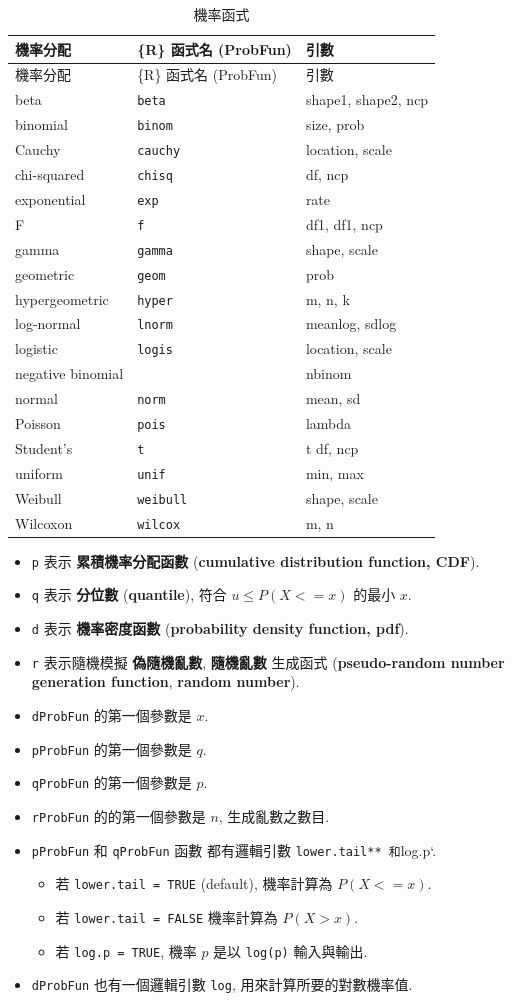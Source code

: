 \documentclass[
]{book}
\providecommand{\tightlist}{%
  \setlength{\itemsep}{0pt}\setlength{\parskip}{0pt}}
\begin{document}
\begin{longtable}[]{@{}lll@{}}
\caption{機率函式}\tabularnewline
\toprule
機率分配 & \{R\} 函式名 (ProbFun) & 引數\tabularnewline
\midrule
\endfirsthead
\toprule
機率分配 & \{R\} 函式名 (ProbFun) & 引數\tabularnewline
\midrule
\endhead
beta & \texttt{beta} & shape1, shape2, ncp\tabularnewline
binomial & \texttt{binom} & size, prob\tabularnewline
Cauchy & \texttt{cauchy} & location, scale\tabularnewline
chi-squared & \texttt{chisq} & df, ncp\tabularnewline
exponential & \texttt{exp} & rate\tabularnewline
F & \texttt{f} & df1, df1, ncp\tabularnewline
gamma & \texttt{gamma} & shape, scale\tabularnewline
geometric & \texttt{geom} & prob\tabularnewline
hypergeometric & \texttt{hyper} & m, n, k\tabularnewline
log-normal & \texttt{lnorm} & meanlog, sdlog\tabularnewline
logistic & \texttt{logis} & location, scale\tabularnewline
negative binomial & & nbinom\tabularnewline
normal & \texttt{norm} & mean, sd\tabularnewline
Poisson & \texttt{pois} & lambda\tabularnewline
Student's & \texttt{t} & t df, ncp\tabularnewline
uniform & \texttt{unif} & min, max\tabularnewline
Weibull & \texttt{weibull} & shape, scale\tabularnewline
Wilcoxon & \texttt{wilcox} & m, n\tabularnewline
\bottomrule
\end{longtable}

\begin{itemize}
\tightlist
\item
  \texttt{p} 表示 \textbf{累積機率分配函數} (\textbf{cumulative distribution function, CDF}).
\item
  \texttt{q} 表示 \textbf{分位數} (\textbf{quantile}),
  符合 \(u \le P (X < = x)\) 的最小 \(x\).
\item
  \texttt{d} 表示 \textbf{機率密度函數} (\textbf{probability density function, pdf}).
\item
  \texttt{r} 表示隨機模擬 \textbf{偽隨機亂數}, \textbf{隨機亂數}
  生成函式 (\textbf{pseudo-random number generation function}, \textbf{random number}).
\item
  \texttt{dProbFun} 的第一個參數是 \(x\).
\item
  \texttt{pProbFun} 的第一個參數是 \(q\).
\item
  \texttt{qProbFun} 的第一個參數是 \(p\).
\item
  \texttt{rProbFun} 的的第一個參數是 \(n\), 生成亂數之數目.
\item
  \texttt{pProbFun} 和 \texttt{qProbFun} 函數 都有邏輯引數 \texttt{lower.tail**\ 和}log.p`.

  \begin{itemize}
  \tightlist
  \item
    若 \texttt{lower.tail\ =\ TRUE} (default), 機率計算為 \(P (X < = x)\).
  \item
    若 \texttt{lower.tail\ =\ FALSE} 機率計算為 \(P (X > x)\).
  \item
    若 \texttt{log.p\ =\ TRUE}, 機率 \(p\) 是以 \texttt{log(p)} 輸入與輸出.
  \end{itemize}
\item
  \texttt{dProbFun} 也有一個邏輯引數 \texttt{log}, 用來計算所要的對數機率值.
\end{itemize}
\end{document}
